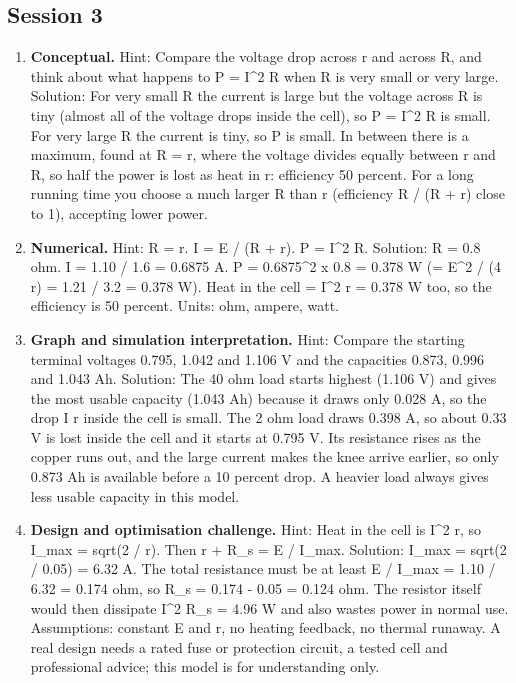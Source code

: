 \documentclass[11pt,a4paper]{article}
\begin{document}
\subsection*{Session 3}
\begin{enumerate}[nosep]
\item \textbf{Conceptual.} Hint: Compare the voltage drop across r and across R, and think about what happens to P = I\textasciicircum{}2 R when R is very small or very large. Solution: For very small R the current is large but the voltage across R is tiny (almost all of the voltage drops inside the cell), so P = I\textasciicircum{}2 R is small. For very large R the current is tiny, so P is small. In between there is a maximum, found at R = r, where the voltage divides equally between r and R, so half the power is lost as heat in r: efficiency 50 percent. For a long running time you choose a much larger R than r (efficiency R / (R + r) close to 1), accepting lower power.
\item \textbf{Numerical.} Hint: R = r. I = E / (R + r). P = I\textasciicircum{}2 R. Solution: R = 0.8 ohm. I = 1.10 / 1.6 = 0.6875 A. P = 0.6875\textasciicircum{}2 x 0.8 = 0.378 W (= E\textasciicircum{}2 / (4 r) = 1.21 / 3.2 = 0.378 W). Heat in the cell = I\textasciicircum{}2 r = 0.378 W too, so the efficiency is 50 percent. Units: ohm, ampere, watt.
\item \textbf{Graph and simulation interpretation.} Hint: Compare the starting terminal voltages 0.795, 1.042 and 1.106 V and the capacities 0.873, 0.996 and 1.043 Ah. Solution: The 40 ohm load starts highest (1.106 V) and gives the most usable capacity (1.043 Ah) because it draws only 0.028 A, so the drop I r inside the cell is small. The 2 ohm load draws 0.398 A, so about 0.33 V is lost inside the cell and it starts at 0.795 V. Its resistance rises as the copper runs out, and the large current makes the knee arrive earlier, so only 0.873 Ah is available before a 10 percent drop. A heavier load always gives less usable capacity in this model.
\item \textbf{Design and optimisation challenge.} Hint: Heat in the cell is I\textasciicircum{}2 r, so I\_max = sqrt(2 / r). Then r + R\_s = E / I\_max. Solution: I\_max = sqrt(2 / 0.05) = 6.32 A. The total resistance must be at least E / I\_max = 1.10 / 6.32 = 0.174 ohm, so R\_s = 0.174 - 0.05 = 0.124 ohm. The resistor itself would then dissipate I\textasciicircum{}2 R\_s = 4.96 W and also wastes power in normal use. Assumptions: constant E and r, no heating feedback, no thermal runaway. A real design needs a rated fuse or protection circuit, a tested cell and professional advice; this model is for understanding only.
\end{enumerate}
\end{document}
